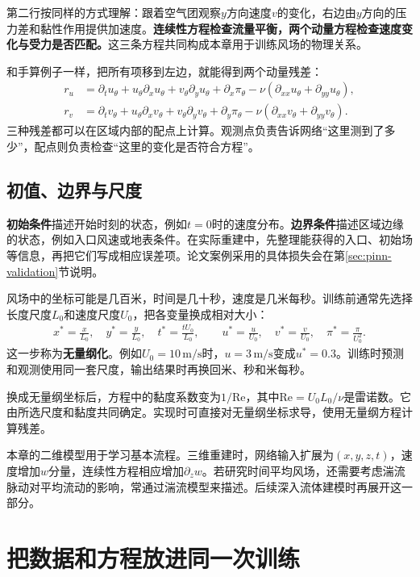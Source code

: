 第二行按同样的方式理解：跟着空气团观察$y$方向速度$v$的变化，右边由$y$方向的压力差和黏性作用提供加速度。\textbf{连续性方程检查流量平衡，两个动量方程检查速度变化与受力是否匹配。}这三条方程共同构成本章用于训练风场的物理关系。

和手算例子一样，把所有项移到左边，就能得到两个动量残差：
\begin{align}
 r_u&=\partial_tu_\theta+u_\theta\partial_xu_\theta
 +v_\theta\partial_yu_\theta+\partial_x\pi_\theta
 -\nu(\partial_{xx}u_\theta+\partial_{yy}u_\theta),\\
 r_v&=\partial_tv_\theta+u_\theta\partial_xv_\theta
 +v_\theta\partial_yv_\theta+\partial_y\pi_\theta
 -\nu(\partial_{xx}v_\theta+\partial_{yy}v_\theta).
 \label{eq:pinn-dimensional-residual}
\end{align}
三种残差都可以在区域内部的配点上计算。观测点负责告诉网络“这里测到了多少”，配点则负责检查“这里的变化是否符合方程”。

\subsection{初值、边界与尺度}
\textbf{初始条件}描述开始时刻的状态，例如$t=0$时的速度分布。\textbf{边界条件}描述区域边缘的状态，例如入口风速或地表条件。在实际重建中，先整理能获得的入口、初始场等信息，再把它们写成相应误差项。论文案例采用的具体损失会在第\ref{sec:pinn-validation}节说明。

风场中的坐标可能是几百米，时间是几十秒，速度是几米每秒。训练前通常先选择长度尺度$L_0$和速度尺度$U_0$，把各变量换成相对大小：
\begin{align}
 x^*=\frac{x}{L_0},\quad y^*=\frac{y}{L_0},\quad
 t^*=\frac{tU_0}{L_0},\qquad
 u^*=\frac{u}{U_0},\quad v^*=\frac{v}{U_0},\quad
 \pi^*=\frac{\pi}{U_0^2}.
 \label{eq:pinn-scales}
\end{align}
这一步称为\textbf{无量纲化}。例如$U_0=10\,\mathrm{m/s}$时，$u=3\,\mathrm{m/s}$变成$u^*=0.3$。训练时预测和观测使用同一套尺度，输出结果时再换回米、秒和米每秒。

换成无量纲坐标后，方程中的黏度系数变为$1/\mathrm{Re}$，其中$\mathrm{Re}=U_0L_0/\nu$是雷诺数。它由所选尺度和黏度共同确定。实现时可直接对无量纲坐标求导，使用无量纲方程计算残差。

本章的二维模型用于学习基本流程。三维重建时，网络输入扩展为$(x,y,z,t)$，速度增加$w$分量，连续性方程相应增加$\partial_zw$。若研究时间平均风场，还需要考虑湍流脉动对平均流动的影响，常通过湍流模型来描述。后续深入流体建模时再展开这一部分。

\section{把数据和方程放进同一次训练}
\label{sec:pinn-training}

